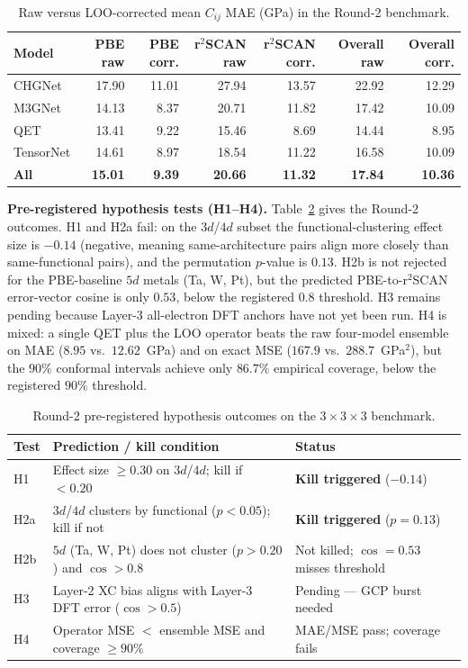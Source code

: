 \documentclass[11pt]{article}
\theoremstyle{remark}
\begin{document}
\begin{table}[t]
\centering
\caption{Raw versus LOO-corrected mean $C_{ij}$ MAE (GPa) in the Round-2
benchmark.}
\label{tab:round2_op}
\small
\begin{tabular}{lrrrrrr}
\toprule
Model & PBE raw & PBE corr. & r$^2$SCAN raw & r$^2$SCAN corr. & Overall raw & Overall corr. \\
\midrule
CHGNet & 17.90 & 11.01 & 27.94 & 13.57 & 22.92 & 12.29 \\
M3GNet & 14.13 & 8.37 & 20.71 & 11.82 & 17.42 & 10.09 \\
QET & 13.41 & 9.22 & 15.46 & 8.69 & 14.44 & 8.95 \\
TensorNet & 14.61 & 8.97 & 18.54 & 11.22 & 16.58 & 10.09 \\
\textbf{All} & \textbf{15.01} & \textbf{9.39} & \textbf{20.66} & \textbf{11.32} & \textbf{17.84} & \textbf{10.36} \\
\bottomrule
\end{tabular}
\end{table}

\textbf{Pre-registered hypothesis tests (H1--H4).} Table~\ref{tab:round2_h}
gives the Round-2 outcomes. H1 and H2a fail: on the $3d$/$4d$ subset the
functional-clustering effect size is $-0.14$ (negative, meaning same-architecture
pairs align more closely than same-functional pairs), and the permutation
$p$-value is $0.13$. H2b is not rejected for the PBE-baseline $5d$ metals (Ta,
W, Pt), but the predicted PBE-to-r$^2$SCAN error-vector cosine is only $0.53$,
below the registered $0.8$ threshold. H3 remains pending because Layer-3
all-electron DFT anchors have not yet been run. H4 is mixed: a single QET plus
the LOO operator beats the raw four-model ensemble on MAE ($8.95$ vs.\ $12.62$~GPa)
and on exact MSE ($167.9$ vs.\ $288.7$~GPa$^2$), but the $90\%$ conformal
intervals achieve only $86.7\%$ empirical coverage, below the registered $90\%$
threshold.

\begin{table}[t]
\centering
\caption{Round-2 pre-registered hypothesis outcomes on the $3{\times}3{\times}3$
benchmark.}
\label{tab:round2_h}
\small
\begin{tabular}{lp{8.5cm}l}
\toprule
Test & Prediction / kill condition & Status \\
\midrule
H1 & Effect size $\ge 0.30$ on $3d$/$4d$; kill if $< 0.20$ & \textbf{Kill triggered} ($-0.14$) \\
H2a & $3d$/$4d$ clusters by functional ($p < 0.05$); kill if not & \textbf{Kill triggered} ($p = 0.13$) \\
H2b & $5d$ (Ta, W, Pt) does not cluster ($p > 0.20$) and $\cos > 0.8$ & Not killed; $\cos = 0.53$ misses threshold \\
H3 & Layer-2 XC bias aligns with Layer-3 DFT error ($\cos > 0.5$) & Pending --- GCP burst needed \\
H4 & Operator MSE $<$ ensemble MSE and coverage $\ge 90\%$ & MAE/MSE pass; coverage fails \\
\bottomrule
\end{tabular}
\end{table}
\end{document}
